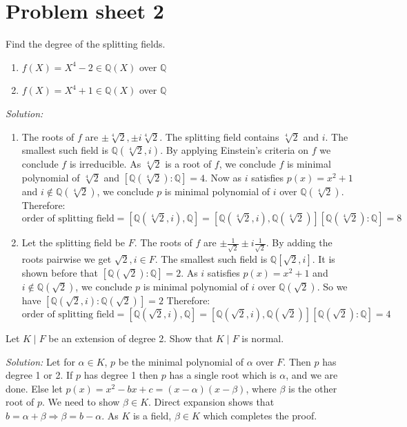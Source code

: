 \documentclass[a4paper, 11pt]{article}
\newenvironment{solution}
    {\textit{Solution:}}
    {}
\begin{document}
\section{Problem sheet 2}


\begin{tcolorbox}[colback=c2,colframe=c1,title=Problem 2.1]
    Find the degree of the splitting fields.
    \begin{enumerate}
        \item $f(X)=X^4-2\in\mathbb Q(X)$ over $\mathbb Q$
        \item $f(X)=X^4+1\in\mathbb Q(X)$ over $\mathbb Q$
    \end{enumerate}
\end{tcolorbox}
\begin{solution}
    \begin{enumerate}
        \item The roots of $f$ are $\pm\sqrt[4]{2},\pm i\sqrt[4]{2}$. The splitting field contains $\sqrt[4]{2}$ and $i$. The smallest such field is $\mathbb{Q}(\sqrt[4]{2},i)$. By applying Einstein's criteria on $f$ we conclude $f$ is irreducible. As $\sqrt[4]{2}$ is a root of $f$, we conclude $f$ is minimal polynomial of $\sqrt[4]{2}$ and $[\mathbb{Q}(\sqrt[4]{2}):\mathbb{Q}]=4$. Now as $i$ satisfies $p(x)=x^2+1$ and $i\notin \mathbb{Q}(\sqrt[4]{2})$, we conclude $p$ is minimal polynomial of $i$ over $\mathbb{Q}(\sqrt[4]{2})$. Therefore:
        $$\text{order of splitting field}=[\mathbb{Q}(\sqrt[4]{2},i),\mathbb{Q}]=[\mathbb{Q}(\sqrt[4]{2},i),\mathbb{Q}(\sqrt[4]{2})][\mathbb{Q}(\sqrt[4]{2}):\mathbb{Q}]=8$$
        \item Let the splitting field be $F$. The roots of $f$ are $\pm\frac{1}{\sqrt{2}}\pm i\frac{1}{\sqrt{2}}$. By adding the roots pairwise we get $\sqrt{2},i\in F$. The smallest such field is $\mathbb{Q}[\sqrt2,i]$. It is shown before that $[\mathbb{Q}(\sqrt{2}):\mathbb{Q}]=2$. As $i$ satisfies $p(x)=x^2+1$ and $i\notin \mathbb{Q}(\sqrt{2})$, we conclude $p$ is minimal polynomial of $i$ over $\mathbb{Q}(\sqrt{2})$. So we have $[\mathbb{Q}(\sqrt{2},i):\mathbb{Q}(\sqrt{2})]=2$ Therefore:
        $$\text{order of splitting field}=[\mathbb{Q}(\sqrt{2},i),\mathbb{Q}]=[\mathbb{Q}(\sqrt{2},i),\mathbb{Q}(\sqrt{2})][\mathbb{Q}(\sqrt{2}):\mathbb{Q}]=4$$
    \end{enumerate}
\end{solution}




\begin{tcolorbox}[colback=c2,colframe=c1,title=Problem 2.2]
    Let $K \mid F$ be an extension of degree 2. Show that $K \mid F$ is normal.
\end{tcolorbox}
\begin{solution}
    Let for $\alpha\in K$, $p$ be the minimal polynomial of $\alpha$ over $F$. Then $p$ has degree 1 or 2. If $p$ has degree 1 then $p$ has a single root which is $\alpha$, and we are done. Else let $p(x)=x^2-b x+c=(x-\alpha)(x-\beta)$, where $\beta$ is the other root of $p$. We need to show $\beta\in K$. Direct expansion shows that  $b=\alpha+\beta\Rightarrow\beta=b-\alpha$. As $K$ is a field, $\beta\in K$ which completes the proof. 
\end{solution}
\end{document}
